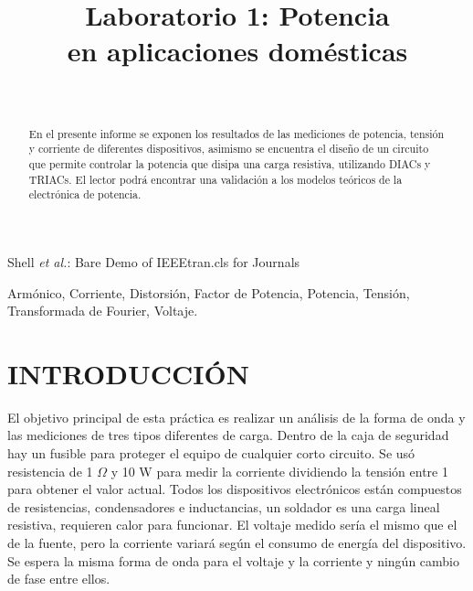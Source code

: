 \documentclass[journal]{IEEEtran}
\begin{document}
\title{\textbf{Laboratorio 1: Potencia \\ en aplicaciones domésticas}}
\author{
  \\
}

%
{Shell \MakeLowercase{\textit{et al.}}: Bare Demo of IEEEtran.cls 
for Journals}
	
\maketitle

\begin{abstract}  
En el presente informe se exponen los resultados de las
mediciones de potencia, tensión y corriente de diferentes
dispositivos, asimismo se encuentra el diseño de un 
circuito que permite controlar la potencia que disipa una 
carga resistiva, utilizando DIACs y TRIACs. El lector 
podrá encontrar una validación a los modelos teóricos 
de la electrónica de potencia. 
\end{abstract}


\begin{IEEEkeywords}  
Armónico, Corriente, Distorsión, Factor de Potencia,  Potencia, Tensión, Transformada de Fourier, Voltaje. 
\end{IEEEkeywords}

\IEEEpeerreviewmaketitle

\section{INTRODUCCIÓN}

El objetivo principal de esta práctica es realizar 
un análisis de la forma de onda y las mediciones 
de tres tipos diferentes de carga. Dentro de la caja 
de seguridad hay un fusible para proteger el equipo 
de cualquier corto circuito. Se usó resistencia 
de 1 $\Omega$ y 10 W para medir la corriente dividiendo 
la tensión entre 1 para obtener el valor actual. 
Todos los dispositivos electrónicos están compuestos 
de resistencias, condensadores e inductancias, un 
soldador es una carga lineal resistiva, requieren calor 
para funcionar. El voltaje medido sería el mismo que 
el de la fuente, pero la corriente variará según el 
consumo de energía del dispositivo. Se espera la misma 
forma de onda para el voltaje y la corriente y ningún 
cambio de fase entre ellos.\\
\end{document}

